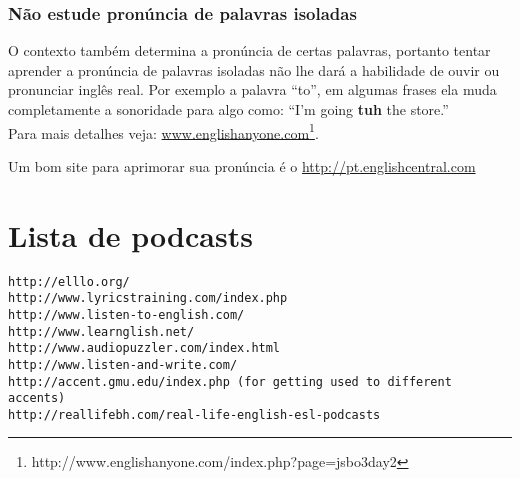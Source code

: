 \subsubsection{Não estude pronúncia de palavras isoladas}

O contexto também determina a pronúncia de certas palavras, portanto tentar
aprender a pronúncia de palavras isoladas não lhe dará a habilidade de ouvir ou
pronunciar inglês real. Por exemplo a palavra ``to'', em algumas frases ela
muda completamente a sonoridade para algo como: ``I’m going {\bf tuh} the
store.'' \\
{\footnotesize {}  Para mais detalhes veja:
\href{http://www.englishanyone.com/index.php?page=jsbo3day2}{www.englishanyone.com}\footnote{http://www.englishanyone.com/index.php?page=jsbo3day2}.}

\noindent
{\footnotesize {} Um bom site para aprimorar sua pronúncia é o \href{http://pt.englishcentral.com}{http://pt.englishcentral.com}}

\section{Lista de podcasts}
\label{sec:lista_de_podcasts}

\begin{verbatim}
http://elllo.org/
http://www.lyricstraining.com/index.php
http://www.listen-to-english.com/
http://www.learnglish.net/
http://www.audiopuzzler.com/index.html
http://www.listen-and-write.com/
http://accent.gmu.edu/index.php (for getting used to different accents)
http://reallifebh.com/real-life-english-esl-podcasts
\end{verbatim}


